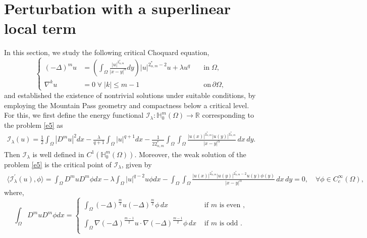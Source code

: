 \documentclass[reqno]{amsart}
\newcommand{\DD} {\displaystyle}
\newcommand{\la} {\lambda}
\newcommand{\Om}{\Omega}
\newcommand{\al} {\alpha}
\newcommand{\De} {\Delta}
\newcommand{\noi} {  \noindent}
\newcommand{\na} {\nabla}
\newcommand{\mb} {\mathbb}
\newcommand{\mc} {\mathcal}
\numberwithin{theorem}{section} \numberwithin{equation}{section}
\begin{document}


\section{\bf{Perturbation with a superlinear local term}}
\noi In this section, we study the  following critical Choquard equation, \\
\begin{equation*}
 \left\{
 \begin{aligned}
(-\Delta)^m u &= \left(\DD\int_{\Om}\frac{|u|^{2_{\al,m}^{*}}}{|x-y|^{\al}}dy\right)  {|u|^{2_{\al,m}^{*}-2} u}+ \la u^q&& \; \text{in}\; \Om,\\
 \nabla^k u&=0\; \forall \; |k|\leq m-1 &&\; \text{on} \, \partial\Om,
\end{aligned}\right.
\end{equation*}
and established the existence of nontrivial solutions under suitable conditions, by employing the Mountain Pass geometry and compactness below a critical level.\\
For this, we first define the energy functional $\mc I_{\la}:\mb{H}_0^{m}(\Om)\to \mb{R}$ corresponding to the problem \eqref{e5} as\\
\begin{align*} 
\mc I_\la(u)= \frac{1}{2}\int_{\Om}|D^{m}u|^2 dx -\frac{\la}{q+1}\int_{\Om}|u|^{q+1} dx-\frac{1}{22^*_{\al, m}}\int_{\Om}\int_{\Om} \frac{|u(x)|^{2_{\al, m}^{*}}|u(y)|^{2_{\al, m}^{*}}}{|x-y|^{\al}} \, dx \, dy.
\end{align*}
Then $\mc{I}_{\la}$ is well defined in $C^1(\mb{H}_0^{m}(\Om))$. Moreover, the weak solution of  the problem \eqref{e5} is the critical point of $\mc{I}_{\la}$, given by
\begin{align*}
    \langle \mc{I}_\la^{\prime}(u), \phi \rangle=\int_{\Om}D^{m}u D^{m} \phi dx -\la\int_{\Om}|u|^{q-2}u{\phi} dx-\int_{\Om}\int_{\Om} \frac{|u(x)|^{2_{\al, m}^{*}}|u(y)|^{2_{\al, m}^{*}-2}u(y){\phi(y)}}{|x-y|^{\al}} \, dx \, dy=0,\quad \forall \phi \in C_c^{\infty}(\Om),
\end{align*}
where, \[\int_{\Om}D^{m}u D^{m} \phi dx =\begin{cases}\DD\int_{\Om}(-\De)^{\frac m2}u  (-\De)^{\frac m2}\phi \,dx  & \text { if } m \text { is even },\\ \\
\DD\int_{\Om}\na(-\De)^{\frac {m-1}{2}}u \cdot\na (-\De)^{\frac{ m-1}{2}}\phi \,dx &\text { if } m \text { is odd }. \\
\end{cases}\]
\end{document}
